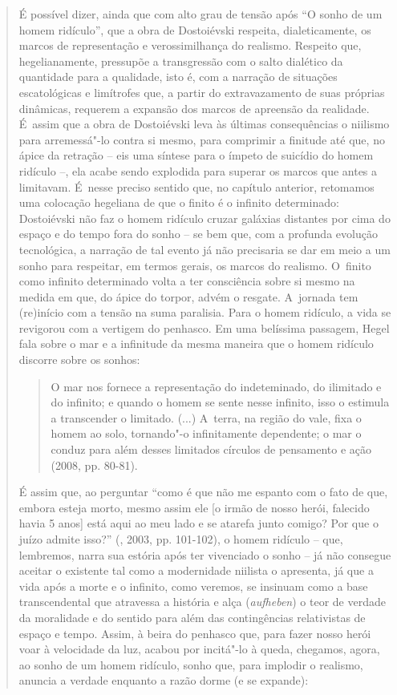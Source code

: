 {\begin{quote}
É possível dizer, ainda que com alto grau de tensão após ``O sonho de um
homem ridículo'', que a obra de Dostoiévski respeita, dialeticamente, os
marcos de representação e verossimilhança do realismo. Respeito que,
hegelianamente, pressupõe a transgressão com o salto dialético da
quantidade para a qualidade, isto é, com a narração de situações
escatológicas e limítrofes que, a partir do extravazamento de suas
próprias dinâmicas, requerem a expansão dos marcos de apreensão da
realidade. É~assim que a obra de Dostoiévski leva às últimas
consequências o niilismo para arremessá"-lo contra si mesmo, para
comprimir a finitude até que, no ápice da retração -- eis uma síntese
para o ímpeto de suicídio do homem ridículo --, ela acabe sendo
explodida para superar os marcos que antes a limitavam. É~nesse preciso
sentido que, no capítulo anterior, retomamos uma colocação hegeliana de
que o finito é o infinito determinado: Dostoiévski não faz o homem
ridículo cruzar galáxias distantes por cima do espaço e do tempo fora do
sonho -- se bem que, com a profunda evolução tecnológica, a narração de
tal evento já não precisaria se dar em meio a um sonho para respeitar,
em termos gerais, os marcos do realismo. O~finito como infinito
determinado volta a ter consciência sobre si mesmo na medida em que, do
ápice do torpor, advém o resgate. A~jornada tem (re)início com a tensão
na suma paralisia. Para o homem ridículo, a vida se revigorou com a
vertigem do penhasco. Em uma belíssima passagem, Hegel fala sobre o mar
e a infinitude da mesma maneira que o homem ridículo discorre sobre os
sonhos:

\begin{quote}
O mar nos fornece a representação do indeteminado, do ilimitado e do
infinito; e quando o homem se sente nesse infinito, isso o estimula a
transcender o limitado. (...) A~terra, na região do vale, fixa o homem
ao solo, tornando"-o infinitamente dependente; o mar o conduz para além
desses limitados círculos de pensamento e ação (2008, pp. 80-81).
\end{quote}

É assim que, ao perguntar ``como é que não me espanto com o fato de que,
embora esteja morto, mesmo assim ele {[}o irmão de nosso herói, falecido
havia 5 anos{]} está aqui ao meu lado e se atarefa junto comigo? Por que
o juízo admite isso?'' (, 2003, pp. 101-102), o homem
ridículo -- que, lembremos, narra sua estória após ter vivenciado o
sonho -- já não consegue aceitar o existente tal como a modernidade
niilista o apresenta, já que a vida após a morte e o infinito, como
veremos, se insinuam como a base transcendental que atravessa a história
e alça (\emph{aufheben}) o teor de verdade da moralidade e do sentido
para além das contingências relativistas de espaço e tempo. Assim, à
beira do penhasco que, para fazer nosso herói voar à velocidade da luz,
acabou por incitá"-lo à queda, chegamos, agora, ao sonho de um homem
ridículo, sonho que, para implodir o realismo, anuncia a verdade
enquanto a razão dorme (e se expande):


\end{quote}}
